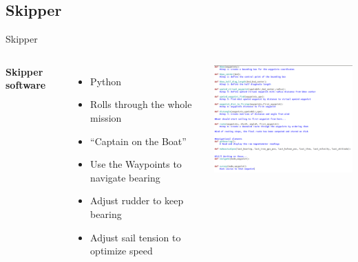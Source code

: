\documentclass[aspectratio=169,unknownkeysallowed,xcolor=dvipsnames,beamer]{beamer} %
\begin{document}
\subsection{Skipper}
\begin{frame}[fragile]{Skipper}
\begin{columns}
\textbf{Skipper software}
\vspace{5mm}
\begin{itemize}
 \item Python 
 \item Rolls through the whole mission
 \item ``Captain on the Boat''
 \item Use the Waypoints to navigate bearing
 \item Adjust rudder to keep bearing
 \item Adjust sail tension to optimize speed
 \end{itemize}
\begin{center}
 \includegraphics[width=8cm]{skipper_py}
\end{center}
\end{columns}
\end{frame}
\end{document}
